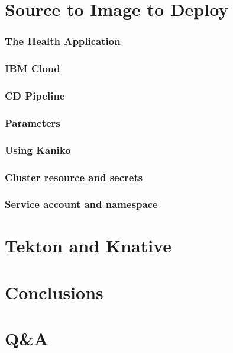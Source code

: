 \documentclass[aspectratio=169,11pt,hyperref={colorlinks=true}]{beamer}
\begin{document}
\section{Source to Image to Deploy}

\begin{grayframe}
  \frametitle{The Health Application}
\end{grayframe}

\begin{grayframe}
  \frametitle{IBM Cloud}
\end{grayframe}

\begin{grayframe}
  \frametitle{CD Pipeline}
\end{grayframe}

\begin{grayframe}
  \frametitle{Parameters}
\end{grayframe}

\begin{grayframe}
  \frametitle{Using Kaniko}
\end{grayframe}

\begin{grayframe}
  \frametitle{Cluster resource and secrets}
\end{grayframe}

\begin{grayframe}
  \frametitle{Service account and namespace}
\end{grayframe}

\section{Tekton and Knative}

\section{Conclusions}

\section{Q\&A}
\end{document}
